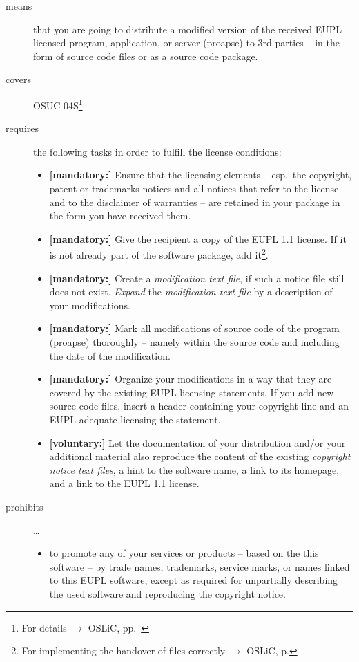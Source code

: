 \begin{description}
\item[means] that you are going to distribute a modified version of the received
EUPL licensed program, application, or server (proapse) to 3rd parties -- in the
form of source code files or as a source code package.
\item[covers] OSUC-04S\footnote{For details $\rightarrow$ OSLiC, pp.\
\pageref{OSUC-04S-DEF}}
\item[requires] the following tasks in order to fulfill the license conditions:
\begin{itemize}
  
  \item \textbf{[mandatory:]} Ensure that the licensing elements -- esp.\ the
  copyright, patent or trademarks notices and all notices that refer to the
  license and to the disclaimer of warranties -- are retained in your package in
  the form you have received them.
  
  \item \textbf{[mandatory:]} Give the recipient a copy of the EUPL 1.1
  license. If it is not already part of the software package, add
  it\footnote{For implementing the handover of files correctly $\rightarrow$
  OSLiC, p. \pageref{DistributingFilesHint}}.

  \item \textbf{[mandatory:]} Create a \emph{modification text file}, if such a
  notice file still does not exist. \emph{Expand} the \emph{modification text
  file} by a description of your modifications.
    
  \item \textbf{[mandatory:]} Mark all modifications of source code of the
  program (proapse) thoroughly -- namely within the source code and including
  the date of the modification.
   
  \item \textbf{[mandatory:]} Organize your modifications in a way that they are
  covered by the existing EUPL licensing statements. If you add new source code
  files, insert a header containing your copyright line and an EUPL adequate
  licensing the statement.
   
  \item \textbf{[voluntary:]} Let the documentation of your distribution and/or
  your additional material also reproduce the content of the existing
  \emph{copyright notice text files}, a hint to the software name, a link to its
  homepage, and a link to the EUPL 1.1 license.
  
 \end{itemize}
 
\item[prohibits] \ldots
\begin{itemize}
  \item to promote any of your services or products -- based on the this software
  -- by trade names, trademarks, service marks, or names linked to this EUPL
  software, except as required for unpartially describing the used software and
  reproducing the copyright notice.
\end{itemize}

\end{description}

